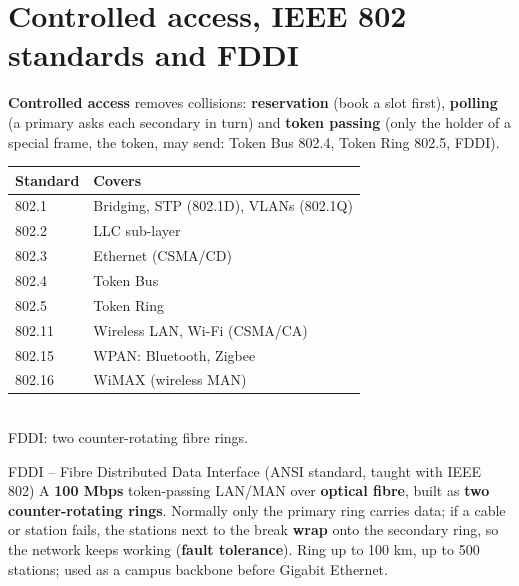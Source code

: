 \documentclass[10pt]{article}
\begin{document}
\section{Controlled access, IEEE 802 standards and FDDI}

\textbf{Controlled access} removes collisions: \textbf{reservation} (book a slot first), \textbf{polling} (a primary asks each secondary in turn) and \textbf{token passing} (only the holder of a special frame, the token, may send: Token Bus 802.4, Token Ring 802.5, FDDI).

\begin{minipage}[c]{0.58\linewidth}
\small
\begin{tabular}{@{}ll@{}}
\toprule
\textbf{Standard} & \textbf{Covers}\\\midrule
802.1 & Bridging, STP (802.1D), VLANs (802.1Q)\\
802.2 & LLC sub-layer\\
802.3 & Ethernet (CSMA/CD)\\
802.4 & Token Bus\\
802.5 & Token Ring\\
802.11 & Wireless LAN, Wi-Fi (CSMA/CA)\\
802.15 & WPAN: Bluetooth, Zigbee\\
802.16 & WiMAX (wireless MAN)\\
\bottomrule
\end{tabular}
\end{minipage}\hfill
\begin{minipage}[c]{0.4\linewidth}
\centering
{}\\
{\scriptsize\color{midgrey}FDDI: two counter-rotating fibre rings.}
\end{minipage}

\begin{keydef}{FDDI -- Fibre Distributed Data Interface (ANSI standard, taught with IEEE 802)}
A \textbf{100 Mbps} token-passing LAN/MAN over \textbf{optical fibre}, built as \textbf{two counter-rotating rings}. Normally only the primary ring carries data; if a cable or station fails, the stations next to the break \textbf{wrap} onto the secondary ring, so the network keeps working (\textbf{fault tolerance}). Ring up to 100 km, up to 500 stations; used as a campus backbone before Gigabit Ethernet.
\end{keydef}
\end{document}
